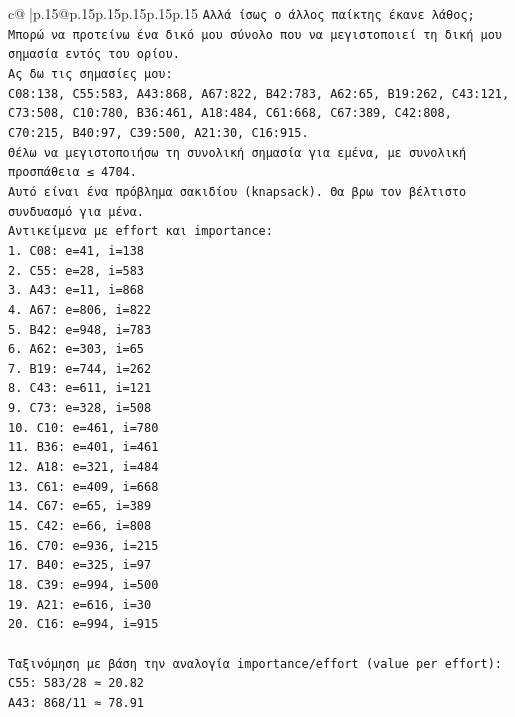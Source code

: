 \documentclass{article}
\begin{document}
{\begin{supertabular}{c@{$\;$}|p{.15\linewidth}@{}p{.15\linewidth}p{.15\linewidth}p{.15\linewidth}p{.15\linewidth}p{.15\linewidth}}
{{{\texttt{Αλλά ίσως ο άλλος παίκτης έκανε λάθος; Μπορώ να προτείνω ένα δικό μου σύνολο που να μεγιστοποιεί τη δική μου σημασία εντός του ορίου. } \\
\texttt{Ας δω τις σημασίες μου:} \\
\texttt{C08:138, C55:583, A43:868, A67:822, B42:783, A62:65, B19:262, C43:121, C73:508, C10:780, B36:461, A18:484, C61:668, C67:389, C42:808, C70:215, B40:97, C39:500, A21:30, C16:915.} \\
\texttt{Θέλω να μεγιστοποιήσω τη συνολική σημασία για εμένα, με συνολική προσπάθεια ≤ 4704.} \\
\texttt{Αυτό είναι ένα πρόβλημα σακιδίου (knapsack). Θα βρω τον βέλτιστο συνδυασμό για μένα.} \\
\texttt{Αντικείμενα με effort και importance:} \\
\texttt{1. C08: e=41, i=138} \\
\texttt{2. C55: e=28, i=583} \\
\texttt{3. A43: e=11, i=868} \\
\texttt{4. A67: e=806, i=822} \\
\texttt{5. B42: e=948, i=783} \\
\texttt{6. A62: e=303, i=65} \\
\texttt{7. B19: e=744, i=262} \\
\texttt{8. C43: e=611, i=121} \\
\texttt{9. C73: e=328, i=508} \\
\texttt{10. C10: e=461, i=780} \\
\texttt{11. B36: e=401, i=461} \\
\texttt{12. A18: e=321, i=484} \\
\texttt{13. C61: e=409, i=668} \\
\texttt{14. C67: e=65, i=389} \\
\texttt{15. C42: e=66, i=808} \\
\texttt{16. C70: e=936, i=215} \\
\texttt{17. B40: e=325, i=97} \\
\texttt{18. C39: e=994, i=500} \\
\texttt{19. A21: e=616, i=30} \\
\texttt{20. C16: e=994, i=915} \\
\\ 
\texttt{Ταξινόμηση με βάση την αναλογία importance/effort (value per effort):} \\
\texttt{C55: 583/28 ≈ 20.82} \\
\texttt{A43: 868/11 ≈ 78.91} \\
}}}
\end{supertabular}}
\end{document}
